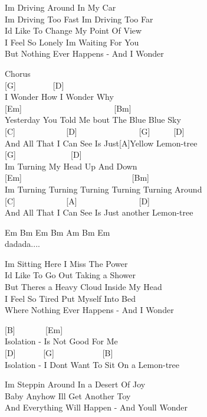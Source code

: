 \documentclass[
  letterpaper,
  twoside=false]{scrbook}
\begin{document}
I\textquotesingle m Driving Around In My Car\\
I\textquotesingle m Driving Too Fast I\textquotesingle m Driving Too
Far\\
I\textquotesingle d Like To Change My Point Of View\\
I Feel So Lonely I\textquotesingle m Waiting For You\\
But Nothing Ever Happens - And I Wonder

Chorus\\
{[}G{]} ~ ~ ~ ~ ~ {[}D{]}\\
I Wonder How I Wonder Why\\
{[}Em{]} ~ ~ ~ ~ ~ ~ ~ ~ ~ ~ ~ ~ ~ {[}Bm{]}\\
Yesterday You Told Me \textquotesingle bout The Blue Blue Sky\\
{[}C{]} ~ ~ ~ ~ ~ ~ ~ {[}D{]} ~ ~ ~ ~ ~ ~ ~ ~ ~{[}G{]} ~ ~ ~ {[}D{]}\\
And All That I Can See Is Just{[}A{]}Yellow Lemon-tree\\
{[}G{]} ~ ~ ~ ~ ~ ~ ~ ~{[}D{]}\\
I\textquotesingle m Turning My Head Up And Down\\
{[}Em{]} ~ ~ ~ ~ ~ ~ ~ ~ ~ ~ ~ ~ ~ ~ ~ ~{[}Bm{]}\\
I\textquotesingle m Turning Turning Turning Turning Turning Around\\
{[}C{]} ~ ~ ~ ~ ~ ~ ~ {[}A{]} ~ ~ ~ ~ ~ ~ ~ ~ ~{[}D{]}\\
And All That I Can See Is Just another Lemon-tree

Em Bm Em Bm Am Bm Em\\
dadada....

I\textquotesingle m Sitting Here I Miss The Power\\
I\textquotesingle d Like To Go Out Taking a Shower\\
But There\textquotesingle s a Heavy Cloud Inside My Head\\
I Feel So Tired Put Myself Into Bed\\
Where Nothing Ever Happens - And I Wonder

{[}B{]} ~ ~ ~ ~ {[}Em{]}\\
Isolation - Is Not Good For Me\\
{[}D{]} ~ ~ ~ ~{[}G{]} ~ ~ ~ ~ ~ ~ ~{[}B{]}\\
Isolation - I Don\textquotesingle t Want To Sit On a Lemon-tree

I\textquotesingle m Steppin\textquotesingle{} Around In a Desert Of
Joy\\
Baby Anyhow I\textquotesingle ll Get Another Toy\\
And Everything Will Happen - And You\textquotesingle ll Wonder
\end{document}
